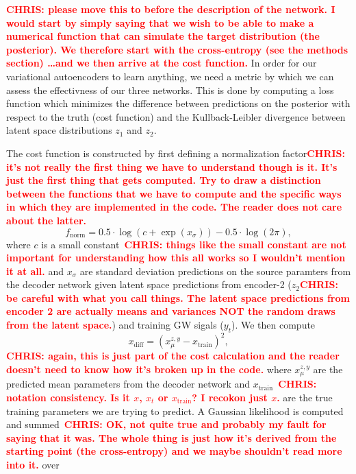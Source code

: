 \documentclass[%
showpacs,
 amsmath,amssymb,
 aps,
 twocolumn,
 prl,
 reprint,
floatfix,
]{revtex4-1}
\newcommand{\chris}[1]{\textbf{\textcolor{red}{CHRIS: #1}}}
\begin{document}
%
%
\chris{please move this to before the description of the network. I would start
by simply saying that we wish to be able to make a numerical function that can
simulate the target distribution (the posterior). We therefore start with the
cross-entropy (see the methods section) \ldots and we then arrive at the cost
function.}
In order for our variational autoencoders to learn anything, we need a metric
by which we can assess the effectivness of our three networks. This is done by
computing a loss function which minimizes the difference between predictions on
the posterior with respect to the truth (cost function) and the
Kullback-Leibler divergence between latent space distributions $z_1$ and $z_2$. 

%
%
The cost function is constructed by first defining a normalization
factor\chris{it's not really the first thing we have to understand though is
it. It's just the first thing that gets computed. Try to draw a distinction
between the functions that we have to compute and the specific ways in which
they are implemented in the code. The reader does not care about the latter.}
%
\begin{equation}
    f_{\textrm{norm}} = 0.5 \cdot \log(c + \exp(x_{\sigma})) - 0.5 \cdot \log(2\pi),
\end{equation}
%
where $c$ is a small constant~\chris{things like the small constant are not
important for understanding how this all works so I wouldn't mention it at all.}
and $x_{\sigma}$ are standard deviation predictions on the source paramters
from the decoder network given latent space predictions from encoder-2
($z_2$\chris{be careful with what you call things.  The latent space
predictions from encoder 2 are actually means and variances NOT the random
draws from the latent space.}) and training GW sigals ($y_{t}$). We then
compute 
%
\begin{equation}
    x_{\textrm{diff}} = (x^{z,y}_{\mu} - x_{\textrm{train}})^{2},
\end{equation}
%
\chris{again, this is just part of the cost calculation and the reader doesn't
need to know how it's broken up in the code.} where $x^{z,y}_{\mu}$ are the
predicted mean parameters from the decoder network and
$x_{\textrm{train}}$~\chris{notation consistency. Is it $x$, $x_t$ or
$x_{\text{train}}$? I recokon just $x$.} are the true training parameters we
are trying to predict. A Gaussian likelihood is computed and summed~\chris{OK,
not quite true and probably my fault for saying that it was. The whole thing is
just how it's derived from the starting point (the cross-entropy) and we maybe
shouldn't read more into it.} over
\end{document}
